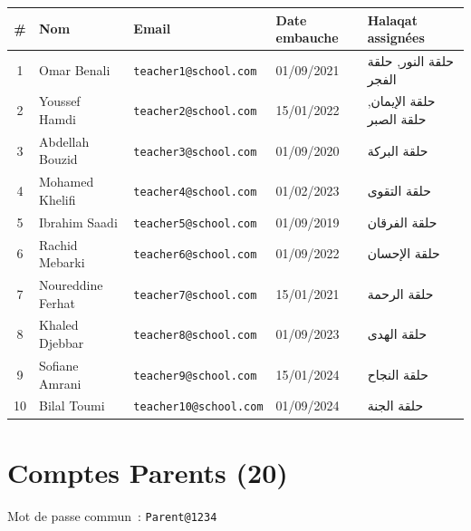 \documentclass[a4paper,11pt]{article}
\begin{document}
\begin{longtable}{c l l l l}
    \toprule
    \textbf{\#} & \textbf{Nom}          & \textbf{Email}                    & \textbf{Date embauche} & \textbf{Halaqat assignées} \\
    \midrule
    \endhead
    1  & Omar Benali       & \texttt{teacher1@school.com}  & 01/09/2021 & حلقة النور, حلقة الفجر \\
    2  & Youssef Hamdi      & \texttt{teacher2@school.com}  & 15/01/2022 & حلقة الإيمان, حلقة الصبر \\
    3  & Abdellah Bouzid    & \texttt{teacher3@school.com}  & 01/09/2020 & حلقة البركة \\
    4  & Mohamed Khelifi    & \texttt{teacher4@school.com}  & 01/02/2023 & حلقة التقوى \\
    5  & Ibrahim Saadi      & \texttt{teacher5@school.com}  & 01/09/2019 & حلقة الفرقان \\
    6  & Rachid Mebarki     & \texttt{teacher6@school.com}  & 01/09/2022 & حلقة الإحسان \\
    7  & Noureddine Ferhat  & \texttt{teacher7@school.com}  & 15/01/2021 & حلقة الرحمة \\
    8  & Khaled Djebbar     & \texttt{teacher8@school.com}  & 01/09/2023 & حلقة الهدى \\
    9  & Sofiane Amrani     & \texttt{teacher9@school.com}  & 15/01/2024 & حلقة النجاح \\
    10 & Bilal Toumi        & \texttt{teacher10@school.com} & 01/09/2024 & حلقة الجنة \\
    \bottomrule
\end{longtable}

\vspace{0.5cm}

\section*{\textcolor{parentcolor}{Comptes Parents (20)}}

\noindent Mot de passe commun~: \texttt{Parent@1234}

\vspace{0.3cm}
\end{document}
